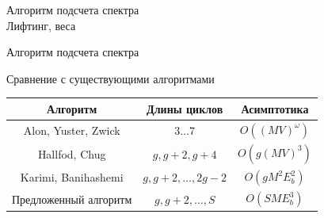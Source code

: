 \documentclass[t,13pt,graphics=pdflatex,xcolor=table,aspectratio=43]{beamer}
\begin{document}
\begin{frame}{Алгоритм подсчета спектра \\ Лифтинг, веса}
    \begin{minipage}{0.2\textwidth}
        \centering
        
    \end{minipage}\hfill
    \begin{minipage}{0.75\textwidth}
        \centering
        
    \end{minipage}
    \vfill
\end{frame}

\begin{frame}{Алгоритм подсчета спектра}

\begin{center}
\scalebox{0.65}{
\begin{minipage}{\linewidth}
	\begin{algorithm}[H]
	\begin{algorithmic}
		\Function{CountCycles}{$A$, $L_{\max}$}
		\State $E \gets \textsc{size}(A,1)$
		\For{$L \gets [1; \lfloor\frac{L_{\max}}{2}\rfloor$]}
			\For{$i \gets [0; E)$}
				\State $a_0^i \gets (\underbrace{0,0,...,0}_{i \text{ раз}},1,0,...,0)$
				\State $a_{2L}^i \gets a_0^i \cdot A^L$ \label{aeq2}
				\State $b_{2L} \gets b_{2L} + a_{2L}^i$ \label{aeq3}
			\EndFor
			\State $g_{2L} \gets 0$
			\For{$d \gets [1; 2L]$, $d|2L$}
				\State $g_{2L} \gets g_{2L} + \mu(d) \cdot T_d(b_{2L/d})$
			\EndFor
			\State $g_{2L} \gets g_{2L} / 2L$
			\For{$d \gets [1; 2L]$, $d|2L$}
				\For{$w \gets [0; M)$, $\frac{w \cdot 2L}{d}=0\pmod{M}$}
					\State $C_{2L} \gets C_{2L} + g^{(w)}_d(0)$ \label{aeq5}
				\EndFor
			\EndFor
		\EndFor
		\State\Return $C$
	\EndFunction	\end{algorithmic}
\end{algorithm}
\end{minipage}
}
\end{center}

\end{frame}

\begin{frame}{Сравнение с существующими алгоритмами}
	\begin{center}
	\begin{tabular}{|c|c|c|}
	\hline
	Алгоритм & Длины циклов & Асимптотика\\
	\hline
	Alon, Yuster, Zwick &  $3 \ldots 7$ & $O((MV)^{\omega})$ \\
	\hline
	Hallfod, Chug &  $g, g+2, g+4$ & $O(g(MV)^3)$\\
	\hline
	Karimi, Banihashemi & $g, g+2, \ldots, 2g-2$ & $O(gM^2E_b^2)$ \\
	\hline
	Предложенный алгоритм & $g, g+2, \ldots, S$ & $O(SME_b^3)$ \\
	\hline
\end{tabular}
\end{center}

\end{frame}
\end{document}
